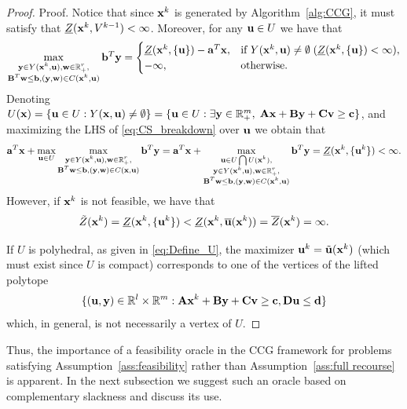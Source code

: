 \documentclass[12pt,x11names]{article}
\theoremstyle{definition}
\newcommand{\real}{\mathbb{R}} %
\newcommand{\ba}{{\bf a}}
\newcommand{\bb}{{\bf b}}
\newcommand{\bc}{{\bf c}}
\newcommand{\bd}{{\bf d}}
\newcommand{\bu}{{\bf u}}
\newcommand{\bv}{{\bf v}}
\newcommand{\bw}{{\bf w}}
\newcommand{\bx}{{\bf x}}
\newcommand{\by}{{\bf y}}
\newcommand{\bba}{{\bf A}}
\newcommand{\bbb}{{\bf B}}
\newcommand{\bbc}{{\bf C}}
\newcommand{\bbd}{{\bf D}}
\begin{document}
\begin{proof}{Proof.}
Notice that since $\bx^k$ is generated by Algorithm~\ref{alg:CCG}, it must satisfy that
$\underline{Z}(\bx^k,V^{k-1})<\infty$. Moreover, for any $\bu\in U$ we have that
\begin{equation}\label{eq:CS_breakdown}
\max_{\substack{\by\in Y(\bx^k,\bu),\bw\in\real^r_+,\\
\bbb^T\bw\leq \bb,(\by,\bw)\in C(\bx^k,\bu)}}\bb^T\by=\begin{cases}
\underline{Z}(\bx^k,\{\bu\})-\ba^T\bx,& \text{if }Y(\bx^k,\bu)\neq\emptyset\; (\underline{Z}(\bx^k,\{\bu\})<\infty),\\
-\infty, & \text{otherwise}. %
\end{cases}
\end{equation}
Denoting $U(\bx)=\{\bu\in U:Y(\bx,\bu)\neq \emptyset\}=\{\bu\in U:\exists \by\in\real^m_+ ,\; \bba\bx+\bbb\by+\bbc\bv\geq \bc \}$, and 
maximizing the LHS of \eqref{eq:CS_breakdown} over $\bu$ we obtain that
$$\ba^T\bx+\max_{\bu\in U}\max_{\substack{\by\in Y(\bx^k,\bu),\bw\in\real^r_+,\\
\bbb^T\bw\leq \bb,(\by,\bw)\in C(\bx,\bu)}}\bb^T\by=\ba^T\bx+\max_{\substack{\bu\in U\bigcap U(\bx^k),\\
\by\in Y(\bx^k,\bu),\bw\in\real^r_+,\\
\bbb^T\bw\leq \bb,(\by,\bw)\in C(\bx^k,\bu)}} \bb^T\by= \underline{Z}(\bx^k,\{\bu^k\})<\infty.$$
However, if $\bx^k$ is not feasible, we have that $$\tilde{Z}(\bx^k)=\underline{Z}(\bx^k,\{\bu^k\})<\underline{Z}(\bx^k,\overline{\bu}(\bx^k))=\overline{Z}(\bx^k)=\infty.$$

If $U$ is polyhedral, as given in \eqref{eq:Define_U}, the maximizer $\bu^k=\tilde{\bu}(\bx^k)$ (which must exist since $U$ is compact)
corresponds to one of the vertices of the lifted polytope
$$\{(\bu,\by)\in\real^l\times\real^m:\bba\bx^k+\bbb\by+\bbc\bv\geq \bc,\bbd\bu\leq \bd\}$$
which, in general, is not necessarily a vertex of $U$. %
\end{proof}
Thus, the importance of a feasibility oracle in the CCG framework for problems satisfying Assumption~\ref{ass:feasibility} rather than Assumption~\ref{ass:full recourse} is apparent.
In the next subsection we suggest such an oracle based on complementary slackness and discuss its use.
\end{document}
